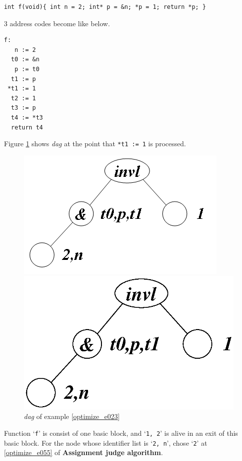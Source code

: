 \begin{Example}
\label{optimize_e023}
\begin{verbatim}
int f(void){ int n = 2; int* p = &n; *p = 1; return *p; }
\end{verbatim}
3 address codes become like below.
\begin{verbatim}
f:
   n := 2
  t0 := &n
   p := t0
  t1 := p
 *t1 := 1
  t2 := 1
  t3 := p
  t4 := *t3
  return t4
\end{verbatim}
Figure \ref{optimize_e024} shows {\em dag} at the point
that {\tt{*t1 := 1}} is processed.
\begin{figure}[htbp]
\begin{center}
\begin{htmlonly}
\includegraphics[width=0.7\linewidth,height=0.423\linewidth]{opt010.png}
\end{htmlonly}
\begin{latexonly}
\includegraphics[width=0.7\linewidth,height=0.423\linewidth]{opt010.eps}
\end{latexonly}
\caption{{\em dag} of example \ref{optimize_e023}}
\label{optimize_e024}
\end{center}
\end{figure}
Function `{\tt{f}}' is consist of one basic block, and 
`{\tt{1, 2}}' is alive in an exit of this basic block.
For the node whose identifier list is `{\tt{2, n}}',
chose `{\tt{2}}' at \ref{optimize_e055} of {\bf Assignment judge algorithm}.

\end{Example}
